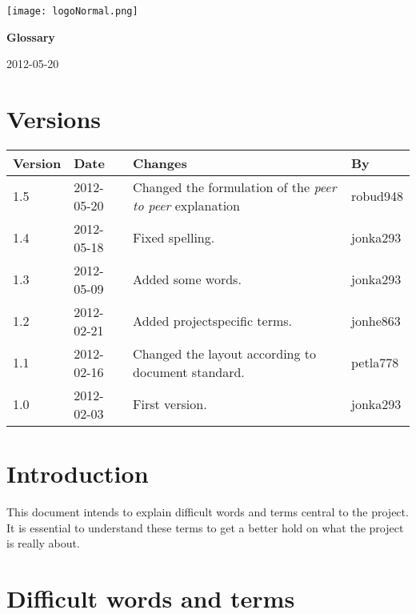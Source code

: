 \documentclass[a4paper, 12pt, titlepage]{article}
\begin{document}
	
	\begin{titlepage}
		
		\texttt{[image: logoNormal.png]}
		
		\vspace{6cm}
		
		\begin{center}
			\Huge{\textbf{Glossary}}
			
			\vspace{0.5cm}
			
			\huge{2012-05-20} %
		\end{center}
		
	\end{titlepage}
	
	\tableofcontents
	\newpage
	
	\section*{Versions}
	\begin{tabularx}{1\textwidth}{|l|l|X|l|}
		\hline
		\bf{Version} & \bf{Date} & \bf{Changes} & \bf{By} \\
		\hline
		1.5 & 2012-05-20 & Changed the formulation of the \emph{peer to peer} explanation & robud948 \\
		\hline
		1.4 & 2012-05-18 & Fixed spelling. & jonka293 \\
		\hline
		1.3 & 2012-05-09 & Added some words. & jonka293 \\
		\hline
		1.2 & 2012-02-21 & Added projectspecific terms. & jonhe863 \\
		\hline
		1.1 & 2012-02-16 & Changed the layout according to document standard. & petla778 \\
		\hline
		1.0 & 2012-02-03 & First version. & jonka293 \\
		\hline
	\end{tabularx}
	\newpage

\section{Introduction}
This document intends to explain difficult words and terms central to the project. It is essential to understand these terms to get a better hold on what the project is really about.

\section{Difficult words and terms}
\end{document}
